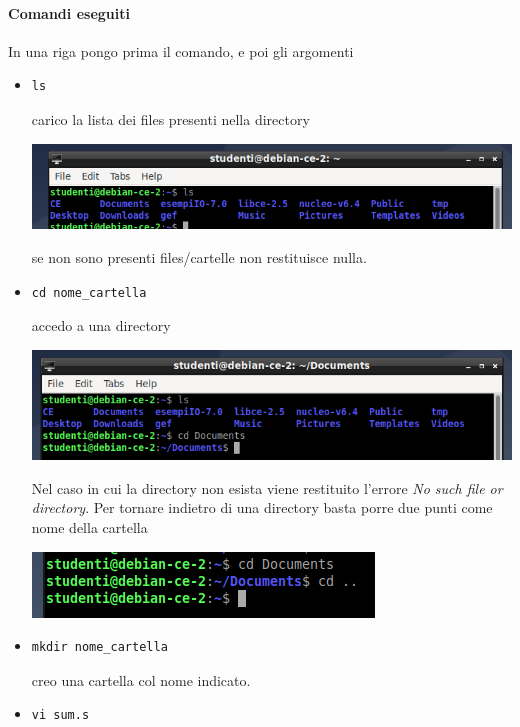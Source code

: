 \documentclass[11pt]{report}
\theoremstyle{definition}
\begin{document}
\paragraph{Comandi eseguiti} In una riga pongo prima il comando, e poi gli argomenti
\begin{itemize}
\item \begin{verbatim}ls\end{verbatim}
carico la lista dei files presenti nella directory
\begin{center}
	\includegraphics[scale=.8]{img/135.PNG}
\end{center}
se non sono presenti files/cartelle non restituisce nulla.
\item \begin{verbatim}cd nome_cartella\end{verbatim}
accedo a una directory
\begin{center}
	\includegraphics[scale=.8]{img/136.PNG}
\end{center}
Nel caso in cui la directory non esista viene restituito l'errore \emph{No such file or directory}. Per tornare indietro di una directory basta porre due punti come nome della cartella
\begin{center}
	\includegraphics[scale=.9]{img/137.PNG}
\end{center}
\item \begin{verbatim}mkdir nome_cartella\end{verbatim}
creo una cartella col nome indicato.
\item \begin{verbatim}vi sum.s\end{verbatim}

\end{itemize}
\end{document}
